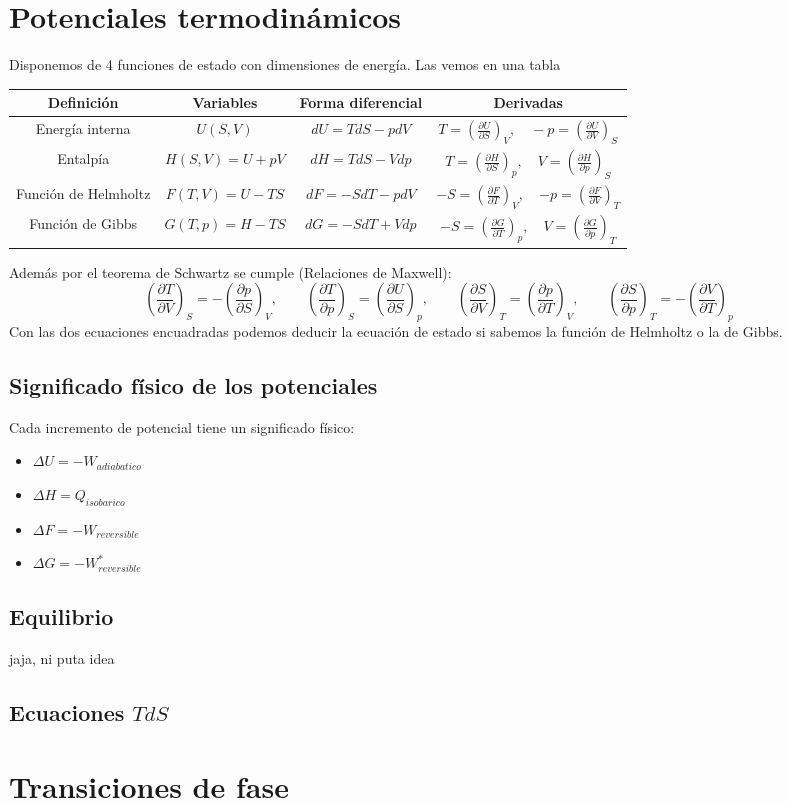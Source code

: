 \documentclass{myclass}
\begin{document}
\section{Potenciales termodinámicos}
Disponemos de 4 funciones de estado con dimensiones de energía. Las vemos en una tabla
\begin{center}
\begin{tabular}{|c|c|c|c|}
  \hline
  Definición & Variables & Forma diferencial & Derivadas \\
  \hline
  Energía interna & $U(S, V)$  & $dU = TdS - pdV$ & $\displaystyle T = \left( \frac{\partial U}{\partial S} \right)_V, \quad -p = \left( \frac{\partial U}{\partial V} \right)_S  $ \\
  \hline
  Entalpía & $H(S, V) = U + pV$  & $dH = TdS - Vdp$ & $\displaystyle T = \left( \frac{\partial H}{\partial S} \right)_p, \quad V = \left( \frac{\partial H}{\partial p} \right)_S  $ \\
  \hline
  Función de Helmholtz & $F(T, V)=U-TS$  & $dF = -SdT - pdV$ & $ \displaystyle  -S = \left( \frac{\partial F}{\partial T} \right)_V, \quad \boxed{-p = \left( \frac{\partial F}{\partial V} \right)_T}  $ \\
  \hline
  Función de Gibbs & $G(T, p) = H-TS$  & $dG = -SdT + Vdp$ & $\displaystyle -S = \left( \frac{\partial G}{\partial T} \right)_p, \quad \boxed{V = \left( \frac{\partial G}{\partial p} \right)_T } $ \\
  \hline
  
\end{tabular}
\end{center}
Además por el teorema de Schwartz se cumple (Relaciones de Maxwell):
\[
  \left( \frac{\partial T}{\partial V} \right)_S = -\left( \frac{\partial p}{\partial S} \right)_V , \qquad \left( \frac{\partial T}{\partial p} \right)_S = \left( \frac{\partial U}{\partial S} \right)_p, \qquad \left( \frac{\partial S}{\partial V} \right)_T = \left( \frac{\partial p}{\partial T} \right)_V, \qquad \left( \frac{\partial S}{\partial p} \right)_T = -\left( \frac{\partial V}{\partial T } \right)_p
\] 
Con las dos ecuaciones encuadradas podemos deducir la ecuación de estado si sabemos la función de Helmholtz o la de Gibbs. 
\subsection{Significado físico de los potenciales}
Cada incremento de potencial tiene un significado físico:
\begin{itemize}
  \item $\Delta U = -W_{adiabatico}$ 
  \item $\Delta H=Q_{isobarico}$ 
  \item $\Delta F = -W_{reversible}$ 
  \item $\Delta G = -W^*_{reversible}$
\end{itemize}

\subsection{Equilibrio}
jaja, ni puta idea

\subsection{Ecuaciones $TdS$}


\section{Transiciones de fase}
\end{document}
